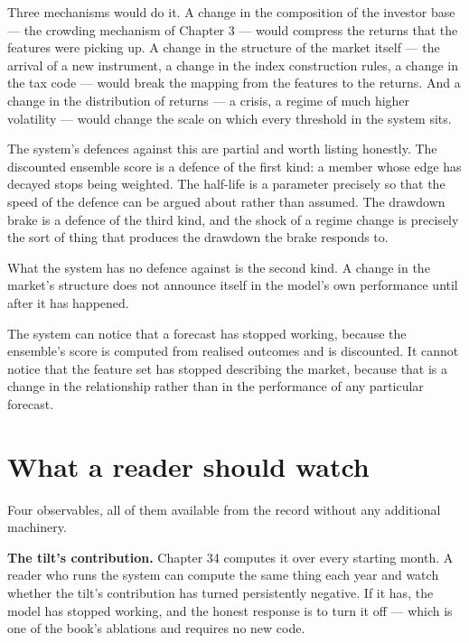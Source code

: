 Three mechanisms would do it. A change in the composition of the investor
base --- the crowding mechanism of Chapter 3 --- would compress the
returns that the features were picking up. A change in the structure of
the market itself --- the arrival of a new instrument, a change in the
index construction rules, a change in the tax code --- would break the
mapping from the features to the returns. And a change in the
distribution of returns --- a crisis, a regime of much higher volatility
--- would change the scale on which every threshold in the system sits.

The system's defences against this are partial and worth listing
honestly. The discounted ensemble score is a defence of the first kind:
a member whose edge has decayed stops being weighted. The half-life is a
parameter precisely so that the speed of the defence can be argued about
rather than assumed. The drawdown brake is a defence of the third kind,
and the shock of a regime change is precisely the sort of thing that
produces the drawdown the brake responds to.

What the system has no defence against is the second kind. A change in
the market's structure does not announce itself in the model's own
performance until after it has happened.

\begin{takeaway}
The system can notice that a forecast has stopped working, because the
ensemble's score is computed from realised outcomes and is discounted. It
cannot notice that the feature set has stopped describing the market,
because that is a change in the relationship rather than in the
performance of any particular forecast.
\end{takeaway}

\section{What a reader should watch}

Four observables, all of them available from the record without any
additional machinery.

\textbf{The tilt's contribution.} Chapter 34 computes it over every
starting month. A reader who runs the system can compute the same thing
each year and watch whether the tilt's contribution has turned
persistently negative. If it has, the model has stopped working, and the
honest response is to turn it off --- which is one of the book's
ablations and requires no new code.

